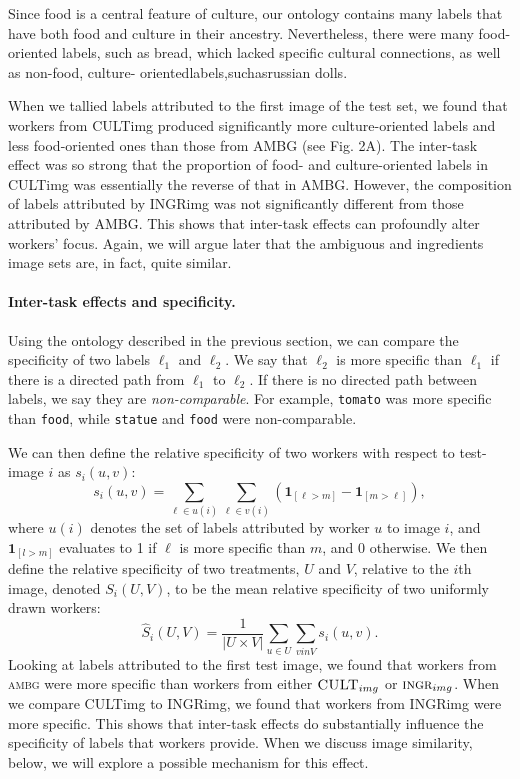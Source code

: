 \documentclass[12pt]{article}
\begin{document}
Since food is a central feature of culture, our ontology contains many labels 
that have both food and culture in their ancestry. Nevertheless, there were 
many food-oriented labels, such as bread, which lacked specific cultural 
connections, as well as non-food, culture- orientedlabels,suchasrussian dolls.

When we tallied labels attributed to the first image of the test set, we found 
that workers from CULTimg produced significantly more culture-oriented labels 
and less food-oriented ones than those from AMBG (see Fig. 2A). The inter-task 
effect was so strong that the proportion of food- and culture-oriented labels 
in CULTimg was essentially the reverse of that in AMBG. However, the 
composition of labels attributed by INGRimg was not significantly different 
from those attributed by AMBG. This shows that inter-task effects can 
profoundly alter workers' focus. Again, we will argue later that the ambiguous 
and ingredients image sets are, in fact, quite similar.

\paragraph{Inter-task effects and specificity.}
Using the ontology described in the previous section, we can compare the 
specificity of two labels $\ell_1$ and $\ell_2$. We say that $\ell_2$ is more specific 
than $\ell_1$ if there is a directed path from $\ell_1$ to $\ell_2$. If there is no 
directed path between labels, we say they are \textit{non-comparable}. For 
example, \texttt{tomato} was more specific than \texttt{food}, while 
\texttt{statue} and \texttt{food} were non-comparable.

We can then define the relative specificity of two workers with respect to 
test-image $i$ as $s_i(u, v)$:
$$
	s_i(u,v) = \sum_{\ell \in u(i)} \sum_{\ell \in v(i)} 
	\left( \mathbf{1}_{[\ell > m]} - \mathbf{1}_{[m>\ell]} \right),
$$
where $u(i)$ denotes the set of labels attributed by worker $u$ to image $i$, 
and $\mathbf{1}_{[l>m]}$ evaluates to 1 if $\ell$ is more specific than $m$, 
and 0 otherwise. We then define the relative specificity of two treatments, 
$U$ and $V$, relative to the $i$th image, denoted $S_i(U,V)$, to be the mean 
relative specificity of two uniformly drawn workers:
$$
	\hat{S}_i(U,V) = \frac{1}{|U \times V|} \sum_{u \in U} \sum_{v in V}
		s_i(u,v).
$$
Looking at labels attributed to the first test image, we found that workers 
from \textsc{ambg} were more specific than workers from either 
$\textsc{CULT}_{img}$ or $\textsc{ingr}_{img}$.  When we compare CULTimg to 
INGRimg, we found that workers from INGRimg were more specific. This shows 
that inter-task effects do substantially influence the specificity of labels 
that workers provide. When we discuss image similarity, below, we will explore 
a possible mechanism for this effect.
\end{document}
